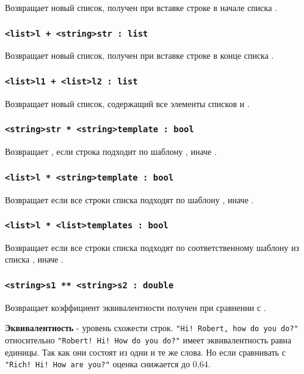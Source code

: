 \documentclass[a4paper, 14pt]{extarticle}
\begin{document}
Возвращает новый список, получен при вставке строке  в начале списка .

\subsubsection{\lstinline`<list>l + <string>str : list`}

Возвращает новый список, получен при вставке строке  в конце списка .

\subsubsection{\lstinline`<list>l1 + <list>l2 : list`}

Возвращает новый список, содержащий все элементы списков  и .

\subsubsection{\lstinline`<string>str * <string>template : bool`}

Возвращает \true{}, если строка  подходит по шаблону , иначе \false{}.

\subsubsection{\lstinline`<list>l * <string>template : bool`}

Возвращает \true{} если все строки списка  подходят по шаблону , иначе \false{}.

\subsubsection{\lstinline`<list>l * <list>templates : bool`}

Возвращает \true{} если все строки списка  подходят по соответственному шаблону из списка , иначе \false{}.

\subsubsection{\lstinline`<string>s1 ** <string>s2 : double`}

Возвращает коэффициент эквивалентности получен при сравнении  с .

{\bf Эквивалентность} - уровень схожести строк. \lstinline`"Hi! Robert, how do you do?"` относительно \lstinline`"Robert! Hi! How do you do?"` имеет эквивалентность равна единицы. Так как они состоят из одни и те же слова. Но если сравнивать с  \lstinline`"Rich! Hi! How are you?"` оценка снижается до 0,64.
\end{document}
